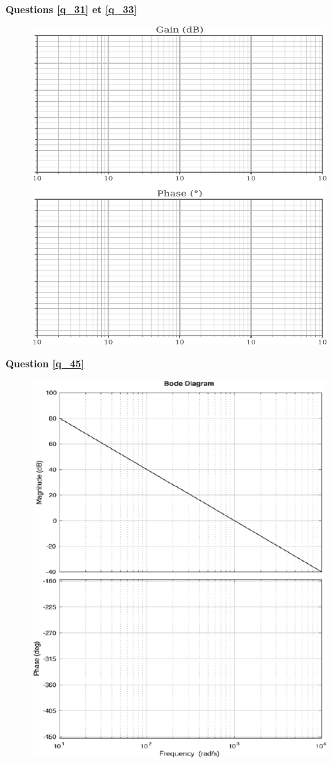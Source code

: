 \documentclass[10pt,fleqn]{article} %
\begin{document}
\textbf{Questions \ref{q_31} et \ref{q_33}}

\begin{figure}[H]
\centering
\includegraphics[width=.8\linewidth]{q_31}
\end{figure}

\newpage

\textbf{Question \ref{q_45} }
\begin{figure}[H]
\centering
\includegraphics[width=.8\linewidth]{q_45}
\end{figure}
\end{document}
